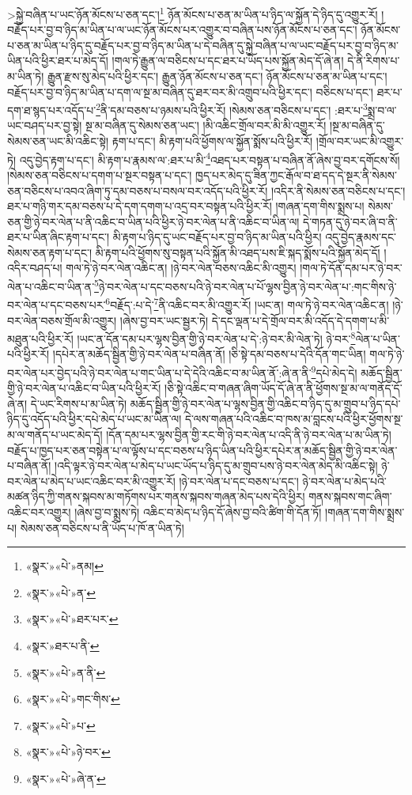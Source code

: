 >སྐྱེ་བཞིན་པ་ཡང་ཉོན་མོངས་པ་ཅན་དང་།\footnote{«སྣར་»«པེ་»ནམ།} ཉོན་མོངས་པ་ཅན་མ་ཡིན་པ་ཉིད་ལ་སྐྱོན་དེ་ཉིད་དུ་འགྱུར་རོ། །བརྗོད་པར་བྱ་བ་ཉིད་མ་ཡིན་པ་ལ་ཡང་ཉོན་མོངས་པར་འགྱུར་བ་བཞིན་པས་ཉོན་མོངས་པ་ཅན་དང་། ཉོན་མོངས་པ་ཅན་མ་ཡིན་པ་ཉིད་དུ་བརྗོད་པར་བྱ་བ་ཉིད་མ་ཡིན་པ་དེ་བཞིན་དུ་སྐྱེ་བཞིན་པ་ལ་ཡང་བརྗོད་པར་བྱ་བ་ཉིད་མ་ཡིན་པའི་ཕྱིར་ཐར་པ་མེད་དོ། །གལ་ཏེ་རྒྱུན་ལ་བཅིངས་པ་དང་ཐར་པ་ཡོད་པས་སྐྱོན་མེད་དོ་ཞེ་ན། དེ་ནི་རིགས་པ་མ་ཡིན་ཏེ། རྒྱུན་རྫས་སུ་མེད་པའི་ཕྱིར་དང་། རྒྱུན་ཉོན་མོངས་པ་ཅན་དང་། ཉོན་མོངས་པ་ཅན་མ་ཡིན་པ་དང་། བརྗོད་པར་བྱ་བ་ཉིད་མ་ཡིན་པ་དག་ལ་སྔ་མ་བཞིན་དུ་ཐར་བར་མི་འགྲུབ་པའི་ཕྱིར་དང་། བཅིངས་པ་དང་། ཐར་པ་དག་ཐ་སྙད་པར་འདོད་པ་\footnote{«སྣར་»«པེ་»ན་}ནི་དམ་བཅས་པ་ཉམས་པའི་ཕྱིར་རོ། །སེམས་ཅན་བཅིངས་པ་དང་། :ཐར་པ་\footnote{«སྣར་»«པེ་»ཐར་པར་}སྨྲ་བ་ལ་ཡང་བཤད་པར་བྱ་སྟེ། སྔ་མ་བཞིན་དུ་སེམས་ཅན་ཡང་། །མི་འཆིང་གྲོལ་བར་མི་མི་འགྱུར་རོ། །སྔ་མ་བཞིན་དུ་སེམས་ཅན་ཡང་མི་འཆིང་སྟེ། རྟག་པ་དང་། མི་རྟག་པའི་ཕྱོགས་ལ་སྐྱོན་སྨོས་པའི་ཕྱིར་རོ། །གྲོལ་བར་ཡང་མི་འགྱུར་ཏེ། འདུ་བྱེད་རྟག་པ་དང་། མི་རྟག་པ་རྣམས་ལ་:ཐར་པ་མི་\footnote{«སྣར་»ཐར་པ་ནི་}འཐད་པར་བསྟན་པ་བཞིན་ནོ་ཞེས་བྱ་བར་དགོངས་སོ། །སེམས་ཅན་བཅིངས་པ་དགག་པ་སྔར་བསྟན་པ་དང་། ཁྱད་པར་མེད་དུ་ཟིན་ཀྱང་རྒོལ་བ་ཐ་དད་དེ་སྔར་ནི་སེམས་ཅན་བཅིངས་པ་འབའ་ཞིག་ཏུ་དམ་བཅས་པ་བསལ་བར་འདོད་པའི་ཕྱིར་རོ། །འདིར་ནི་སེམས་ཅན་བཅིངས་པ་དང་། ཐར་པ་གཉི་གར་དམ་བཅས་པ་དེ་དག་དགག་པ་འདྲ་བར་བསྟན་པའི་ཕྱིར་རོ། །གཞན་དག་གིས་སྨྲས་པ། སེམས་ཅན་གྱི་ཉེ་བར་ལེན་པ་ནི་འཆིང་བ་ཡིན་པའི་ཕྱིར་ཉེ་བར་ལེན་པ་ནི་འཆིང་བ་ཡིན་ལ། དེ་གཏན་དུ་ཉེ་བར་ཞི་བ་ནི་ཐར་པ་ཡིན་ཞིང་རྟག་པ་དང་། མི་རྟག་པ་ཉིད་དུ་ཡང་བརྗོད་པར་བྱ་བ་ཉིད་མ་ཡིན་པའི་ཕྱིར། འདུ་བྱེད་རྣམས་དང་སེམས་ཅན་རྟག་པ་དང་། མི་རྟག་པའི་ཕྱོགས་སུ་བསྟན་པའི་སྐྱོན་མི་འཐད་པས་ཇི་སྐད་སྨོས་པའི་སྐྱོན་མེད་དོ། །འདིར་བཤད་པ། གལ་ཏེ་ཉེ་བར་ལེན་འཆིང་ན། །ཉེ་བར་ལེན་བཅས་འཆིང་མི་འགྱུར། །གལ་ཏེ་དོན་དམ་པར་ཉེ་བར་ལེན་པ་འཆིང་བ་ཡིན་ན་\footnote{«སྣར་»«པེ་»ན་ནི་}ཉེ་བར་ལེན་པ་དང་བཅས་པའི་ཉེ་བར་ལེན་པ་པོ་ལྷས་བྱིན་ཉེ་བར་ལེན་པ་:གང་གིས་ཉེ་བར་ལེན་པ་དང་བཅས་པར་\footnote{«སྣར་»«པེ་»གང་གིས་}བརྗོད་:པ་དེ་\footnote{«སྣར་»«པེ་»པ་}ནི་འཆིང་བར་མི་འགྱུར་རོ། །ཡང་ན། གལ་ཏེ་ཉེ་བར་ལེན་འཆིང་ན། །ཉེ་བར་ལེན་བཅས་གྲོལ་མི་འགྱུར། །ཞེས་བྱ་བར་ཡང་སྦྱར་ཏེ། དེ་དང་ལྡན་པ་དེ་གྲོལ་བར་མི་འདོད་དེ་དགག་པ་མི་མཐུན་པའི་ཕྱིར་རོ། །ཡང་ན་དོན་དམ་པར་ལྷས་བྱིན་གྱི་ཉེ་བར་ལེན་པ་དེ་:ཉེ་བར་མི་ལེན་ཏེ། ཉེ་བར་\footnote{«སྣར་»«པེ་»ཉེ་བར་}ལེན་པ་ཡིན་པའི་ཕྱིར་རོ། །དཔེར་ན་མཆོད་སྦྱིན་གྱི་ཉེ་བར་ལེན་པ་བཞིན་ནོ། །ཅི་སྟེ་དམ་བཅས་པ་དེའི་དོན་གང་ཡིན། གལ་ཏེ་ཉེ་བར་ལེན་པར་བྱེད་པའི་ཉེ་བར་ལེན་པ་གང་ཡིན་པ་དེ་དེའི་འཆིང་བ་མ་ཡིན་ནོ་:ཞེ་ན་ནི་\footnote{«སྣར་»«པེ་»ཞེ་ན་}དཔེ་མེད་དེ། མཆོད་སྦྱིན་གྱི་ཉེ་བར་ལེན་པ་འཆིང་བ་ཡིན་པའི་ཕྱིར་རོ། །ཅི་སྟེ་འཆིང་བ་གཞན་ཞིག་ཡོད་དོ་ཞེ་ན་ནི་ཕྱོགས་སྔ་མ་ལ་གནོད་དོ་ཞེ་ན། དེ་ཡང་རིགས་པ་མ་ཡིན་ཏེ། མཆོད་སྦྱིན་གྱི་ཉེ་བར་ལེན་པ་ལྷས་བྱིན་གྱི་འཆིང་བ་ཉིད་དུ་མ་གྲུབ་པ་ཉིད་དཔེ་ཉིད་དུ་འདོད་པའི་ཕྱིར་དཔེ་མེད་པ་ཡང་མ་ཡིན་ལ། དེ་ལས་གཞན་པའི་འཆིང་བ་ཁས་མ་བླངས་པའི་ཕྱིར་ཕྱོགས་སྔ་མ་ལ་གནོད་པ་ཡང་མེད་དོ། །དོན་དམ་པར་ལྷས་བྱིན་གྱི་རང་གི་ཉེ་བར་ལེན་པ་འདི་ནི་ཉེ་བར་ལེན་པ་མ་ཡིན་ཏེ། བརྗོད་པ་ཁྱད་པར་ཅན་བསྟེན་པ་ལ་ལྟོས་པ་དང་བཅས་པ་ཉིད་ཡིན་པའི་ཕྱིར་དཔེར་ན་མཆོད་སྦྱིན་གྱི་ཉེ་བར་ལེན་པ་བཞིན་ནོ། །འདི་ལྟར་ཉེ་བར་ལེན་པ་མེད་པ་ཡང་ཡོད་པ་ཉིད་དུ་མ་གྲུབ་པས་ཉེ་བར་ལེན་མེད་མི་འཆིང་སྟེ། ཉེ་བར་ལེན་པ་མེད་པ་ཡང་འཆིང་བར་མི་འགྱུར་རོ། །ཉེ་བར་ལེན་པ་དང་བཅས་པ་དང་། ཉེ་བར་ལེན་པ་མེད་པའི་མཚན་ཉིད་ཀྱི་གནས་སྐབས་མ་གཏོགས་པར་གནས་སྐབས་གཞན་མེད་པས་དེའི་ཕྱིར། གནས་སྐབས་གང་ཞིག་འཆིང་བར་འགྱུར། །ཞེས་བྱ་བ་སྨྲས་ཏེ། འཆིང་བ་མེད་པ་ཉིད་དོ་ཞེས་བྱ་བའི་ཚིག་གི་དོན་ཏོ། །གཞན་དག་གིས་སྨྲས་པ། སེམས་ཅན་བཅིངས་པ་ནི་ཡོད་པ་ཁོ་ན་ཡིན་ཏེ། 
